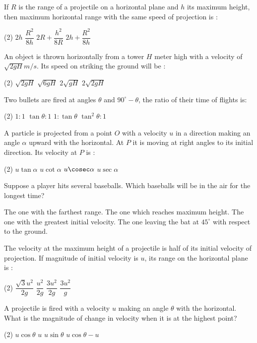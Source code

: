 
\item If $R$ is the range of  a projectile on a horizontal plane and $h$ its maximum height, then maximum horizontal range with the same speed of projection is :
\begin{tasks}(2)
\task $2h$
\task $\dfrac{R^2}{8h}$
\task $2R + \dfrac{h^2}{8R}$
\task $2h + \dfrac{R^2}{8h}$\ans
\end{tasks}

\item An object is thrown horizontally from a tower $H$ meter high with a velocity of $\sqrt{2gH} m/s$. Its speed on striking the ground will be :
\begin{tasks}(2)
\task $\sqrt{2gH}$
\task $\sqrt{6gH}$
\task $2\sqrt{gH}$\ans
\task $2\sqrt{2gH}$
\end{tasks}

\item Two bullets are fired at angles $\theta$ and  $90^\circ -\theta$, the ratio of their time of flights is:
\begin{tasks}(2)
\task $1 : 1$
\task $\tan \theta : 1$\ans
\task $1 : \tan \theta$
\task $\tan^2 \theta : 1$
\end{tasks}

\item A particle is projected from a point $O$ with a velocity $u$ in a direction making an angle $\alpha$ upward with the horizontal. At $P$ it is moving at right angles to its initial direction. Its velocity at $P$ is :
\begin{tasks}(2)
\task $u\tan \alpha$
\task $u\cot \alpha$\ans
\task $u \cosec \alpha$
\task $u\sec \alpha$
\end{tasks}



\item Suppose a player hits several baseballs. Which baseballs will be in the air for the longest time?
\begin{tasks}
\task The one with the farthest range.
\task The one which reaches maximum height.\ans
\task The one with the greatest initial velocity.
\task The one leaving the bat at $45^\circ$ with respect to the ground.
\end{tasks}

\item The velocity at the maximum height of a projectile is half of its initial velocity of projection. If magnitude of initial velocity is $u$, its range on the horizontal plane is :
\begin{tasks}(2)
\task $\dfrac{\sqrt{3}u^2}{2g}$\ans
\task $\dfrac{u^2}{2g}$
\task $\dfrac{3u^2}{2g}$
\task $\dfrac{3u^2}{g}$
\end{tasks}



\item A projectile is fired with a velocity $u$ making an angle $\theta$ with the horizontal. What is the magnitude of change in velocity when it is at the highest point?
\begin{tasks}(2)
\task $u\cos \theta$
\task $u$
\task $u\sin \theta$\ans
\task $u\cos \theta -u$
\end{tasks}
